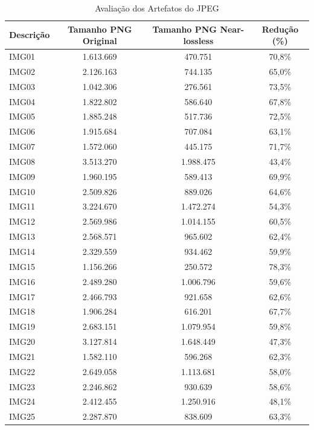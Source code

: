 \begin{table}[H]
    \centering
    \caption{Avaliação dos Artefatos do JPEG}
    \label{tab:6b}

    \footnotesize
    \begin{tabularx}{\textwidth}{X|C|C|C}
    \hline
        Descrição & Tamanho PNG Original & Tamanho PNG Near-lossless & Redução (\%) \\ \hline
        IMG01 & 1.613.669 & 470.751 & 70,8\% \\ 
        IMG02 & 2.126.163 & 744.135 & 65,0\% \\ 
        IMG03 & 1.042.306 & 276.561 & 73,5\% \\ 
        IMG04 & 1.822.802 & 586.640 & 67,8\% \\ 
        IMG05 & 1.885.248 & 517.736 & 72,5\% \\ 
        IMG06 & 1.915.684 & 707.084 & 63,1\% \\ 
        IMG07 & 1.572.060 & 445.175 & 71,7\% \\ 
        IMG08 & 3.513.270 & 1.988.475 & 43,4\% \\ 
        IMG09 & 1.960.195 & 589.413 & 69,9\% \\ 
        IMG10 & 2.509.826 & 889.026 & 64,6\% \\ 
        IMG11 & 3.224.670 & 1.472.274 & 54,3\% \\ 
        IMG12 & 2.569.986 & 1.014.155 & 60,5\% \\ 
        IMG13 & 2.568.571 & 965.602 & 62,4\% \\ 
        IMG14 & 2.329.559 & 934.462 & 59,9\% \\ 
        IMG15 & 1.156.266 & 250.572 & 78,3\% \\ 
        IMG16 & 2.489.280 & 1.006.796 & 59,6\% \\ 
        IMG17 & 2.466.793 & 921.658 & 62,6\% \\ 
        IMG18 & 1.906.284 & 616.201 & 67,7\% \\ 
        IMG19 & 2.683.151 & 1.079.954 & 59,8\% \\ 
        IMG20 & 3.127.814 & 1.648.449 & 47,3\% \\ 
        IMG21 & 1.582.110 & 596.268 & 62,3\% \\ 
        IMG22 & 2.649.058 & 1.113.681 & 58,0\% \\ 
        IMG23 & 2.246.862 & 930.639 & 58,6\% \\ 
        IMG24 & 2.412.455 & 1.250.916 & 48,1\% \\ 
        IMG25 & 2.287.870 & 838.609 & 63,3\% \\ 

\end{tabularx}
\end{table}
